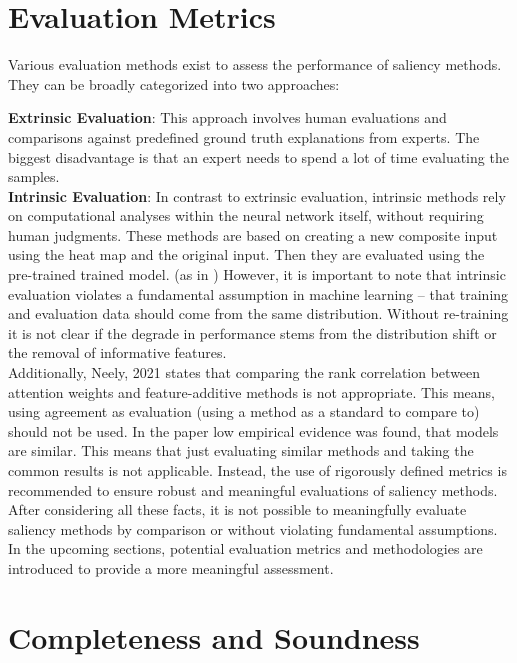 \section{Evaluation Metrics}

Various evaluation methods exist to assess the performance of saliency methods. They can be broadly categorized into two approaches: \cite{gupta2022new}


\textbf{Extrinsic Evaluation}: 
 This approach involves human evaluations and comparisons against predefined ground truth explanations from experts.\cite{zhang2018} The biggest disadvantage is that an expert needs to spend a lot of time evaluating the samples.
\\
\textbf{Intrinsic Evaluation}: 
In contrast to extrinsic evaluation, intrinsic methods rely on computational analyses within the neural network itself, without requiring human judgments. These methods are based on creating a new composite input using the heat map and the original input. Then they are evaluated using the pre-trained trained model. (as in \cite{dabkowski2017real}) However, it is important to note that intrinsic evaluation violates a fundamental assumption in machine learning – that training and evaluation data should come from the same distribution. Without re-training it is not clear if the degrade in performance stems from the distribution shift or the removal of informative features. \cite{hooker2019benchmark}
\\
Additionally, Neely, 2021\cite{neely2021order} states that comparing the rank correlation between attention weights and feature-additive methods is not appropriate. This means, using agreement as evaluation (using a method as a standard to compare to) should not be used. In the paper low empirical evidence was found, that models are similar. This means that just evaluating similar methods and taking the common results is not applicable. Instead, the use of rigorously defined metrics is recommended to ensure robust and meaningful evaluations of saliency methods.
\\
After considering all these facts, it is not possible to meaningfully evaluate saliency methods by comparison or without violating fundamental assumptions. In the upcoming sections, potential evaluation metrics and methodologies are introduced to provide a more meaningful assessment.

\section{Completeness and Soundness}

